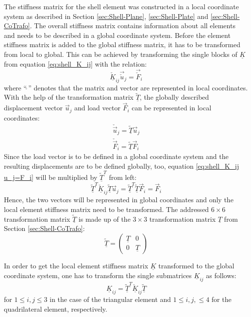  The stiffness matrix for the shell element was constructed in a local coordinate system as described in Section \ref{sec:Shell-Plane}, \ref{sec:Shell-Plate} and \ref{sec:Shell-CoTrafo}. The overall stiffness matrix contains information about all elements and needs to be described in a global coordinate system. Before the element stiffness matrix is added to the global stiffness matrix, it has to be transformed from local to global. This can be achieved by transforming the single blocks of $\underline{K}$ from equation \eqref{eq:shell_K_ij} with the relation:
 \begin{equation}\label{eq:shell_K_ij u_j=F_i}
 \underline{\check{K}}_{ij} \vec{\check{u}}_j = \vec{\check{F}}_i
 \end{equation}
 where ``\;$\check{\ }$\;'' denotes that the matrix and vector are represented in local coordinates. With the help of the transformation matrix $\underline{\tilde{T}}$, the globally described displacement vector $\vec{u}_j$ and load vector $\vec{F}_i$ can be represented in local coordinates:
 \begin{align}
 \check{\vec{u}}_j = \underline{\tilde{T}} \vec{u}_j\\
 \check{\vec{F}}_i = \underline{\tilde{T}} \vec{F}_i
 \end{align}
 Since the load vector is to be defined in a global coordinate system and the resulting displacements are to be defined globally, too, equation \eqref{eq:shell_K_ij u_j=F_i} will be multiplied by $\underline{\tilde{T}}^T$ from left:
 \begin{equation}
 \underline{\tilde{T}}^T \underline{\check{K}}_{ij} \underline{\tilde{T}} \vec{u}_j = \underline{\tilde{T}}^T \underline{\tilde{T}} \vec{F}_i = \vec{F}_i
 \end{equation}
 Hence, the two vectors will be represented in global coordinates and only the local element stiffness matrix need to be transformed. The addressed $6\!\times\!6$ transformation matrix $\underline{\tilde{T}}$ is made up of the $3\!\times\!3$ transformation matrix $\underline{T}$ from Section \ref{sec:Shell-CoTrafo}:
 \begin{equation}\label{eq:trafoTtilde}
 \underline{\tilde{T}} = \begin{pmatrix}
 \underline{T} & 0\\
 0 & \underline{T}
 \end{pmatrix}
 \end{equation}
 
 In order to get the local element stiffness matrix $\underline{K}$ transformed to the global coordinate system, one has to transform the single submatrices $\underline{K}_{ij}$ as follows:
 \begin{equation}\label{eq:Kij=Tt Kij T}
 \underline{K}_{ij} = \underline{\tilde{T}}^T \underline{\check{K}}_{ij} \underline{\tilde{T}}
 \end{equation}
 for $1 \leq i,j \leq 3$ in the case of the triangular element and $1 \leq i,j, \leq 4$ for the quadrilateral element, respectively.